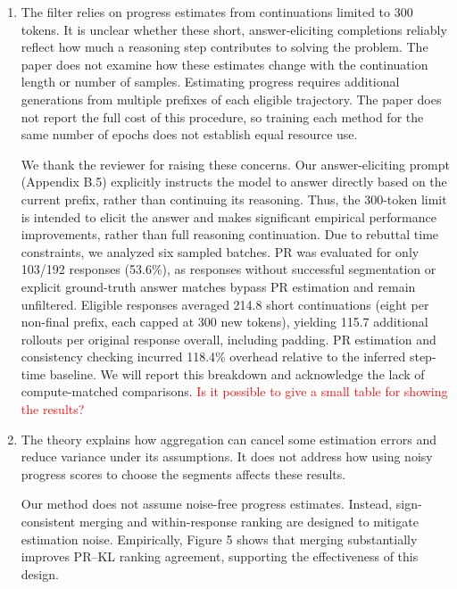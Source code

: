 \begin{enumerate}
\begin{responsebox}[frametitle={Response to W2}]
\vspace*{2\baselineskip}
\end{responsebox}
\item The filter relies on progress estimates from continuations limited to 300 tokens. It is unclear whether these short, answer-eliciting completions reliably reflect how much a reasoning step contributes to solving the problem. The paper does not examine how these estimates change with the continuation length or number of samples. Estimating progress requires additional generations from multiple prefixes of each eligible trajectory. The paper does not report the full cost of this procedure, so training each method for the same number of epochs does not establish equal resource use.
\par{}
\begin{responsebox}[frametitle={Response to W3}]
We thank the reviewer for raising these concerns. Our answer-eliciting prompt (Appendix B.5) explicitly instructs the model to answer directly based on the current prefix, rather than continuing its reasoning. Thus, the 300-token limit is intended to elicit the answer and makes significant empirical performance improvements, rather than full reasoning continuation. Due to rebuttal time constraints, we analyzed six sampled batches. PR was evaluated for only 103/192 responses (53.6\%), as responses without successful segmentation or explicit ground-truth answer matches bypass PR estimation and remain unfiltered. Eligible responses averaged 214.8 short continuations (eight per non-final prefix, each capped at 300 new tokens), yielding 115.7 additional rollouts per original response overall, including padding. PR estimation and consistency checking incurred 118.4\% overhead relative to the inferred step-time baseline. We will report this breakdown and acknowledge the lack of compute-matched comparisons. \textcolor{red}{Is it possible to give a small table for showing the results?}
\end{responsebox}

\item The theory explains how aggregation can cancel some estimation errors and reduce variance under its assumptions. It does not address how using noisy progress scores to choose the segments affects these results.
\par{}
\begin{responsebox}[frametitle={Response to W4}]
Our method does not assume noise-free progress estimates. Instead, sign-consistent merging and within-response ranking are designed to mitigate estimation noise. Empirically, Figure 5 shows that merging substantially improves PR--KL ranking agreement, supporting the effectiveness of this design.
\end{responsebox}


\end{enumerate}
